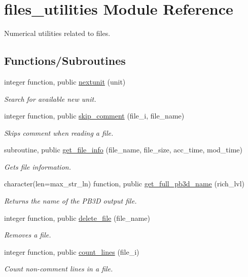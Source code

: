 \hypertarget{namespacefiles__utilities}{}\section{files\+\_\+utilities Module Reference}
\label{namespacefiles__utilities}


Numerical utilities related to files.  


\subsection*{Functions/\+Subroutines}
\begin{DoxyCompactItemize}
\item 
integer function, public \hyperlink{namespacefiles__utilities_ac6066df405564ba2f5e3c4bba726c1f8}{nextunit} (unit)
\begin{DoxyCompactList}\small\item\em Search for available new unit. \end{DoxyCompactList}\item 
integer function, public \hyperlink{namespacefiles__utilities_ac5befac3b753b28003e6878bec2af381}{skip\+\_\+comment} (file\+\_\+i, file\+\_\+name)
\begin{DoxyCompactList}\small\item\em Skips comment when reading a file. \end{DoxyCompactList}\item 
subroutine, public \hyperlink{namespacefiles__utilities_a07f2e430ff33c1e291731ad64c1fe482}{get\+\_\+file\+\_\+info} (file\+\_\+name, file\+\_\+size, acc\+\_\+time, mod\+\_\+time)
\begin{DoxyCompactList}\small\item\em Gets file information. \end{DoxyCompactList}\item 
character(len=max\+\_\+str\+\_\+ln) function, public \hyperlink{namespacefiles__utilities_a43f1c2b7e128b1b2cdbcdb8963daab0e}{get\+\_\+full\+\_\+pb3d\+\_\+name} (rich\+\_\+lvl)
\begin{DoxyCompactList}\small\item\em Returns the name of the P\+B3D output file. \end{DoxyCompactList}\item 
integer function, public \hyperlink{namespacefiles__utilities_a083c08dfd3919fa2a1df01507fe431af}{delete\+\_\+file} (file\+\_\+name)
\begin{DoxyCompactList}\small\item\em Removes a file. \end{DoxyCompactList}\item 
integer function, public \hyperlink{namespacefiles__utilities_a3ec80c9937d23aba0d8da951ea292a83}{count\+\_\+lines} (file\+\_\+i)
\begin{DoxyCompactList}\small\item\em Count non-\/comment lines in a file. \end{DoxyCompactList}\end{DoxyCompactItemize}


